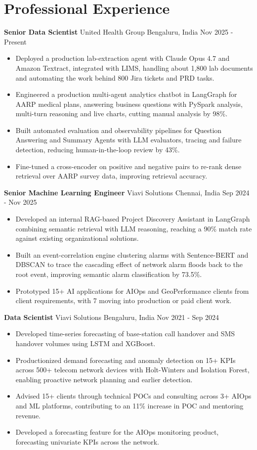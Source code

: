 \documentclass[10pt,a4paper]{article}
\newcommand{\role}[4]{\textbf{#1} \textbar{} #2 \hfill #3 \textbar{} #4\par}
\begin{document}
\section{Professional Experience}
\role{Senior Data Scientist}{United Health Group}{Bengaluru, India}{Nov 2025 - Present}
\begin{itemize}
  \item Deployed a production lab-extraction agent with Claude Opus 4.7 and Amazon Textract, integrated with LIMS, handling about 1,800 lab documents and automating the work behind 800 Jira tickets and PRD tasks.
  \item Engineered a production multi-agent analytics chatbot in LangGraph for AARP medical plans, answering business questions with PySpark analysis, multi-turn reasoning and live charts, cutting manual analysis by 98\%.
  \item Built automated evaluation and observability pipelines for Question Answering and Summary Agents with LLM evaluators, tracing and failure detection, reducing human-in-the-loop review by 43\%.
  \item Fine-tuned a cross-encoder on positive and negative pairs to re-rank dense retrieval over AARP survey data, improving retrieval accuracy.
\end{itemize}
\vspace{3pt}
\role{Senior Machine Learning Engineer}{Viavi Solutions}{Chennai, India}{Sep 2024 - Nov 2025}
\begin{itemize}
  \item Developed an internal RAG-based Project Discovery Assistant in LangGraph combining semantic retrieval with LLM reasoning, reaching a 90\% match rate against existing organizational solutions.
  \item Built an event-correlation engine clustering alarms with Sentence-BERT and DBSCAN to trace the cascading effect of network alarm floods back to the root event, improving semantic alarm classification by 73.5\%.
  \item Prototyped 15+ AI applications for AIOps and GeoPerformance clients from client requirements, with 7 moving into production or paid client work.
\end{itemize}
\vspace{3pt}
\role{Data Scientist}{Viavi Solutions}{Bengaluru, India}{Nov 2021 - Sep 2024}
\begin{itemize}
  \item Developed time-series forecasting of base-station call handover and SMS handover volumes using LSTM and XGBoost.
  \item Productionized demand forecasting and anomaly detection on 15+ KPIs across 500+ telecom network devices with Holt-Winters and Isolation Forest, enabling proactive network planning and earlier detection.
  \item Advised 15+ clients through technical POCs and consulting across 3+ AIOps and ML platforms, contributing to an 11\% increase in POC and mentoring revenue.
  \item Developed a forecasting feature for the AIOps monitoring product, forecasting univariate KPIs across the network.
\end{itemize}
\end{document}
